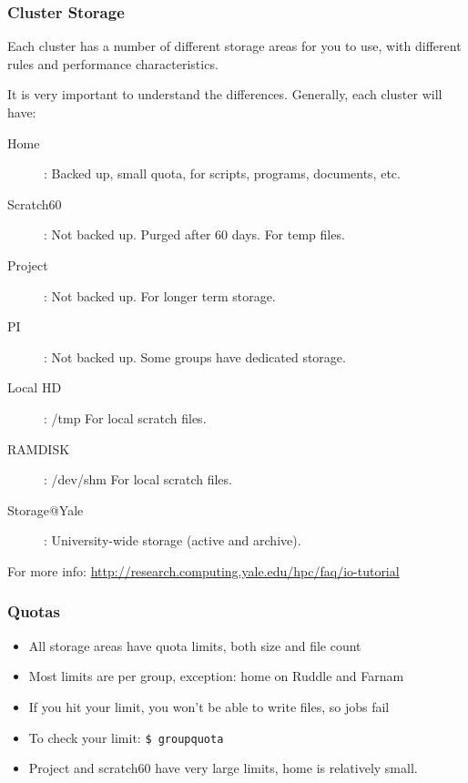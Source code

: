 \documentclass[10pt]{beamer}
\begin{document}
\begin{frame}[fragile]
\frametitle{Cluster Storage}
Each cluster has a number of different storage areas for you to use, with different
rules and performance characteristics.  

\vskip10pt

It is very important to understand the differences.  Generally, each cluster will have:

\begin{description}
\item[Home]: Backed up, small quota, for scripts, programs, documents, etc.
\item[Scratch60]: Not backed up.  Purged after 60 days.  For temp files.
\item[Project]: Not backed up.  For longer term storage.
\item[PI]: Not backed up.  Some groups have dedicated storage.
\item[Local HD]: /tmp  For local scratch files.
\item[RAMDISK]: /dev/shm For local scratch files.
\item[Storage@Yale]: University-wide storage (active and archive).
\end{description}


For more info: \url{http://research.computing.yale.edu/hpc/faq/io-tutorial}

\end{frame}

\begin{frame}[fragile]
\frametitle{Quotas}
\begin{itemize}
\item All storage areas have quota limits, both size and file count
\item Most limits are per group, exception: home on Ruddle and Farnam
\item If you hit your limit, you won't be able to write files, so jobs fail
\item To check your limit: \verb+$ groupquota+
\item Project and scratch60 have very large limits, home is relatively small.
\end{itemize}

\end{frame}
\end{document}
